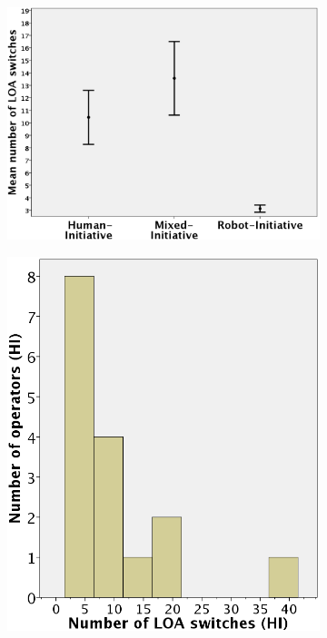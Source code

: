 \documentclass[a4paper,12pt,oneside,openright]{bhamthesis}
\begin{document}
	\begin{figure}
		\centering
		\begin{subfigure}[b]{0.49\textwidth}
			\centering
			\includegraphics[width=\textwidth]{chapter5_fig/exp2_2_loa_switches.png}
			\caption{}
			\label{fig:number-loa-switches_exp2_2}
		\end{subfigure}
		\hfill
		\begin{subfigure}[b]{0.45\textwidth}
			\centering
			\includegraphics[width=\textwidth]{chapter5_fig/histogram_loa_hi_exp2_2.png}

\end{subfigure}
\end{figure}
\end{document}
